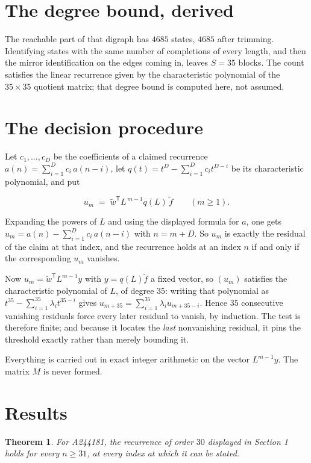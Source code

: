 \documentclass[11pt]{article}
\newtheorem{theorem}{Theorem}
\theoremstyle{definition}
\begin{document}
\section{The degree bound, derived}

The reachable part of that digraph has $4685$ states, $4685$ after trimming. Identifying states with the same number of completions of every length, and then the mirror identification on the edges coming in, leaves $S = 35$ blocks. The count satisfies the linear recurrence given by the characteristic polynomial of the $35\times35$ quotient matrix; that degree bound is computed here, not assumed.

\section{The decision procedure}

Let $c_1,\dots,c_D$ be the coefficients of a claimed recurrence $a(n) = \sum_{i=1}^{D} c_i\,a(n-i)$, let $q(t) = t^{D} - \sum_{i=1}^{D} c_i t^{D-i}$ be its characteristic polynomial, and put

\[u_m \;=\; \tilde w^{\mathsf T} L^{\,m-1} q(L)\,\tilde f \qquad (m \ge 1).\]

Expanding the powers of $L$ and using the displayed formula for $a$, one gets $u_m = a(n) - \sum_{i=1}^{D} c_i\,a(n-i)$ with $n = m + D$. So $u_m$ is exactly the residual of the claim at that index, and the recurrence holds at an index $n$ if and only if the corresponding $u_m$ vanishes.

Now $u_m = \tilde w^{\mathsf T} L^{m-1} y$ with $y = q(L)\tilde f$ a fixed vector, so $(u_m)$ satisfies the characteristic polynomial of $L$, of degree $35$: writing that polynomial as $t^{35} - \sum_{i=1}^{35} \lambda_i t^{35-i}$ gives $u_{m+35} = \sum_{i=1}^{35} \lambda_i u_{m+35-i}$. Hence $35$ consecutive vanishing residuals force every later residual to vanish, by induction. The test is therefore finite; and because it locates the {\itshape last} nonvanishing residual, it pins the threshold exactly rather than merely bounding it.

Everything is carried out in exact integer arithmetic on the vector $L^{m-1}y$. The matrix $M$ is never formed.

\section{Results}

\begin{theorem} For A244181, the recurrence of order $30$ displayed in Section 1 holds for every $n \ge 31$, at every index at which it can be stated.\end{theorem}
\end{document}
